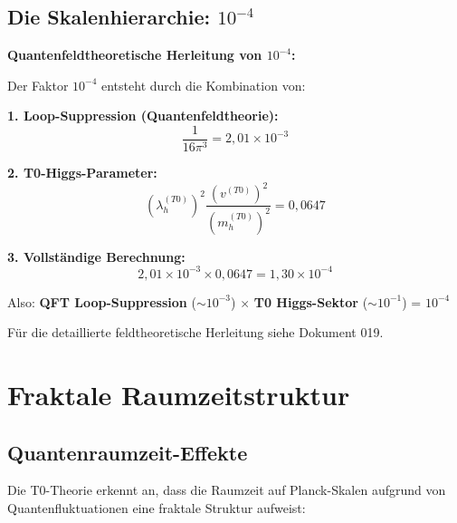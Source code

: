 	\subsection{Die Skalenhierarchie: $10^{-4}$}
	
	\begin{foundation}
		\textbf{Quantenfeldtheoretische Herleitung von $10^{-4}$:}
		
		Der Faktor $10^{-4}$ entsteht durch die Kombination von:
		
		\textbf{1. Loop-Suppression (Quantenfeldtheorie):}
		\begin{equation}
			\frac{1}{16\pi^3} = 2{,}01 \times 10^{-3}
		\end{equation}
		
		\textbf{2. T0-Higgs-Parameter:}
		\begin{equation}
			(\lambda_h^{(T0)})^2 \frac{(v^{(T0)})^2}{(m_h^{(T0)})^2} = 0{,}0647
		\end{equation}
		
		\textbf{3. Vollständige Berechnung:}
		\begin{equation}
			2{,}01 \times 10^{-3} \times 0{,}0647 = 1{,}30 \times 10^{-4}
		\end{equation}
		
		Also: \textbf{QFT Loop-Suppression} ($\sim 10^{-3}$) $\times$ \textbf{T0 Higgs-Sektor} ($\sim 10^{-1}$) = $10^{-4}$
		
		Für die detaillierte feldtheoretische Herleitung siehe Dokument 019.
	\end{foundation}
	
	\section{Fraktale Raumzeitstruktur}
	
	\subsection{Quantenraumzeit-Effekte}
	
	Die T0-Theorie erkennt an, dass die Raumzeit auf Planck-Skalen aufgrund von Quantenfluktuationen eine fraktale Struktur aufweist:
	
